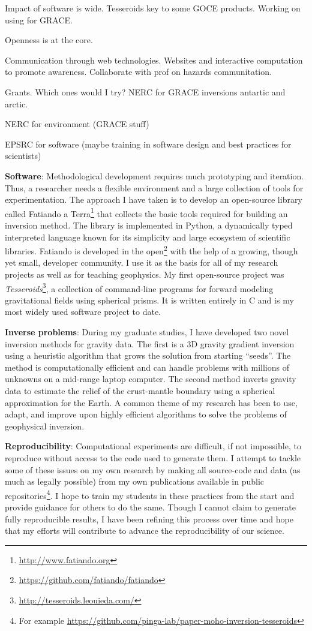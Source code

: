 \documentclass[12pt,notitlepage]{article}
\begin{document}
Impact of software is wide. Tesseroids key to some GOCE products. Working on using for
GRACE.

Openness is at the core.

Communication through web technologies. Websites and interactive computation to promote
awareness. Collaborate with prof on hazards communitation.

Grants. Which ones would I try? NERC for GRACE inversions antartic and arctic.

NERC for environment (GRACE stuff)

EPSRC for software (maybe training in software design and best practices for scientists)







\textbf{Software}:
Methodological development requires
much prototyping and iteration.
%
Thus,
a researcher needs
a flexible environment
and a large collection of tools
for experimentation.
%
The approach I have taken is
to develop an open-source library
called Fatiando a Terra\footnote{\url{http://www.fatiando.org}}
that collects the basic tools
required for building an inversion method.
%
The library is implemented in Python,
a dynamically typed interpreted language
known for its simplicity
and large ecosystem of scientific libraries.
%
Fatiando is developed in the
open\footnote{\url{https://github.com/fatiando/fatiando}}
with the help of a growing, though yet small,
developer community.
%
I use it as the basis for
all of my research projects
as well as for teaching geophysics.
%
My first open-source project
was \textit{Tesseroids}\footnote{\url{http://tesseroids.leouieda.com/}},
a collection of command-line programs
for forward modeling gravitational fields
using spherical prisms.
%
It is written entirely in C
and is my most widely used software project to date.


\textbf{Inverse problems}:
During my graduate studies,
I have developed two novel inversion methods
for gravity data.
%
The first is a 3D gravity gradient inversion
using a heuristic algorithm
that grows the solution from starting ``seeds''.
%
The method is computationally efficient
and can handle problems with millions of unknowns
on a mid-range laptop computer.
%
The second method inverts gravity data
to estimate the relief
of the crust-mantle boundary
using a spherical approximation for the Earth.
%
A common theme of my research has been
to use, adapt, and improve upon
highly efficient algorithms
to solve the problems of geophysical inversion.


\textbf{Reproducibility}:
Computational experiments
are difficult, if not impossible, to reproduce
without access to the code used to generate them.
%
I attempt to tackle
some of these issues
on my own research
by making all source-code and data
(as much as legally possible)
from my own publications
available in public repositories\footnote{For example \url{https://github.com/pinga-lab/paper-moho-inversion-tesseroids}}.
%
I hope to train my students
in these practices from the start
and provide guidance for others to do the same.
%
Though I cannot claim
to generate fully reproducible results,
I have been refining this process over time
and hope that my efforts will contribute
to advance the reproducibility of our science.
\end{document}
